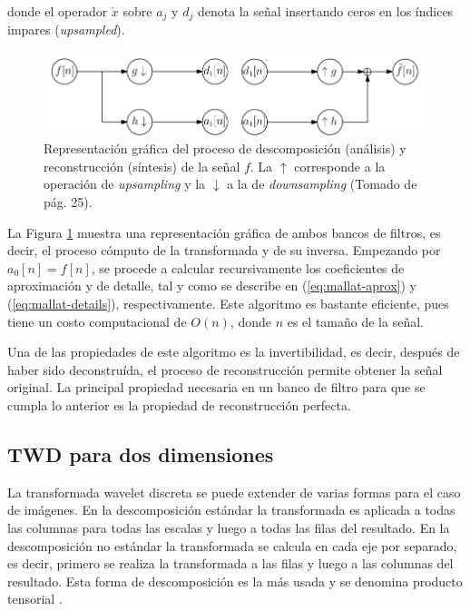 \noindent donde el operador $\check x$ sobre $a_j$ y $d_j$ denota la señal insertando ceros en los índices impares
(\textit{upsampled}).

\begin{figure}\label{fig:dwt-filterbanks-1D}
	\includegraphics[scale=0.5]{Graphics/dwt-filterbanks-1D.png}
	\caption{Representación gráfica del proceso de descomposición (análisis) y reconstrucción (síntesis) de la señal $f$. La $\uparrow$ corresponde a la operación de \textit{upsampling} y la $\downarrow$ a la de \textit{downsampling} (Tomado de \cite{Recoskie2018} pág. 25).}\label{fig:dwt-filterbanks-1D}
\end{figure}

La Figura \ref{fig:dwt-filterbanks-1D} muestra una representación gráfica de ambos bancos de filtros, es decir, 
el proceso cómputo de la transformada y de su inversa. Empezando por $a_0[n] = f[n]$, se procede a calcular recursivamente
los coeficientes de aproximación y de detalle, tal y como se describe en (\ref{eq:mallat-aprox}) y (\ref{eq:mallat-details}),
respectivamente. Este algoritmo es bastante eficiente, pues tiene un costo computacional de $O(n)$, donde $n$
es el tamaño de la señal. 

Una de las propiedades de este algoritmo es la invertibilidad, es decir, después de haber sido deconstruída, el proceso
de reconstrucción permite obtener la señal original. La principal propiedad necesaria en un banco de filtro 
para que se cumpla lo anterior es la propiedad de reconstrucción perfecta. 

\subsection{TWD para dos dimensiones}\label{section:dwt-2d}

La transformada wavelet discreta se puede extender de varias formas para el caso de imágenes.
En la descomposición estándar la transformada es aplicada a todas las columnas para todas las escalas
y luego a todas las filas del resultado. En la descomposición no estándar la transformada se calcula en cada
eje por separado, es decir, primero se realiza la transformada a las filas y luego a las columnas del resultado. 
Esta forma de descomposición es la más usada y se denomina producto tensorial \cite{WaveletVariants2D}.


